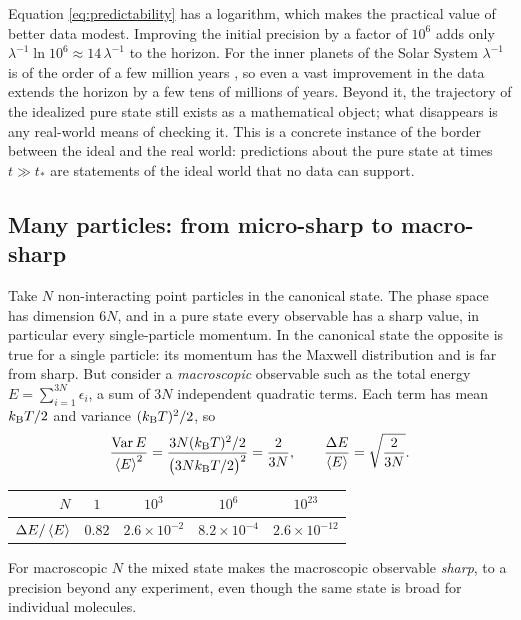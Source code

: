 Equation \eqref{eq:predictability} has a logarithm, which makes the practical value of better data modest. Improving the initial precision by a factor of $10^6$ adds only $\lambda^{-1}\ln10^6\approx14\,\lambda^{-1}$ to the horizon. For the inner planets of the Solar System $\lambda^{-1}$ is of the order of a few million years \cite{Laskar1989}, so even a vast improvement in the data extends the horizon by a few tens of millions of years. Beyond it, the trajectory of the idealized pure state still exists as a mathematical object; what disappears is any real-world means of checking it. This is a concrete instance of the border between the ideal and the real world: predictions about the pure state at times $t\gg t_*$ are statements of the ideal world that no data can support.

\subsection{Many particles: from micro-sharp to macro-sharp}
\label{sec:manyparticles}

Take $N$ non-interacting point particles in the canonical state. The phase space has dimension $6N$, and in a pure state every observable has a sharp value, in particular every single-particle momentum. In the canonical state the opposite is true for a single particle: its momentum has the Maxwell distribution and is far from sharp. But consider a \emph{macroscopic} observable such as the total energy $E=\sum_{i=1}^{3N}\epsilon_i$, a sum of $3N$ independent quadratic terms. Each term has mean $k_{\mathrm B} T/2$ and variance $(k_{\mathrm B} T)^2/2$, so
\begin{equation}
\frac{\operatorname{Var} E}{\left\langle E\right\rangle^2}=\frac{3N(k_{\mathrm B} T)^2/2}{\bigl(3Nk_{\mathrm B} T/2\bigr)^2}=\frac{2}{3N},\qquad
\frac{\Delta E}{\left\langle E\right\rangle}=\sqrt{\frac2{3N}}.
\end{equation}
\begin{center}
\begin{tabular}{r|cccc}
$N$ & $1$ & $10^3$ & $10^6$ & $10^{23}$\\ \hline
$\Delta E/\left\langle E\right\rangle$ & $0.82$ & $2.6\times10^{-2}$ & $8.2\times10^{-4}$ & $2.6\times10^{-12}$
\end{tabular}
\end{center}
For macroscopic $N$ the mixed state makes the macroscopic observable \emph{sharp}, to a precision beyond any experiment, even though the same state is broad for individual molecules.


